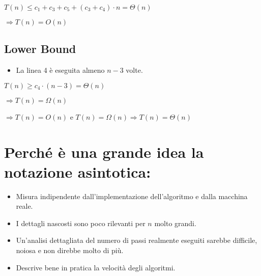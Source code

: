 \documentclass{article}
\begin{document}
$T(n) \leq c_1 + c_3 + c_5 + (c_3 + c_4) \cdot n = \Theta(n)$

$\Rightarrow T(n) = O(n)$

\subsection{Lower Bound}
\begin{itemize}
    \item La linea 4 è eseguita almeno $n-3$ volte.
\end{itemize}

$T(n) \geq c_4 \cdot (n-3) = \Theta(n)$

$\Rightarrow T(n) = \Omega(n)$

$\Rightarrow T(n) = O(n)$ e $T(n) = \Omega(n) \Rightarrow T(n) = \Theta(n)$

\section{Perché è una grande idea la notazione asintotica:}
\begin{itemize}
    \item Misura indipendente dall'implementazione dell'algoritmo e dalla macchina reale.
    \item I dettagli nascosti sono poco rilevanti per $n$ molto grandi.
    \item Un'analisi dettagliata del numero di passi realmente eseguiti sarebbe difficile, noiosa e non direbbe molto di più.
    \item Descrive bene in pratica la velocità degli algoritmi.
\end{itemize}
\end{document}
